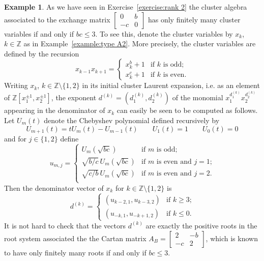 \documentclass{amsart}
\theoremstyle{definition}
\newtheorem{example}[theorem]{Example}
\theoremstyle{remark}
\numberwithin{equation}{section}
\newcommand{\ZZ}{{\mathbb{Z}}}
\begin{document}
  \begin{example}
    As we have seen in Exercise~\ref{exercise:rank 2} the cluster algebra associated to the exchange matrix $\left[\begin{array}{cc}0 & b\\ -c & 0\end{array}\right]$ has only finitely many cluster variables if and only if $bc\le3$.  To see this, denote the cluster variables by $x_k$, $k\in\ZZ$ as in Example~\ref{example:type A2}.  More precisely, the cluster variables are defined by the recursion
    \[x_{k-1}x_{k+1}=\begin{cases}x_k^b+1 & \text{if $k$ is odd;}\\ x_k^c+1 & \text{if $k$ is even.}\end{cases}\]
    Writing $x_k$, $k\in\ZZ\setminus\{1,2\}$ in its initial cluster Laurent expansion, i.e. as an element of $\ZZ[x_1^{\pm1},x_2^{\pm1}]$, the exponent $d^{(k)}=(d_1^{(k)},d_2^{(k)})$ of the monomial $x_1^{d^{(k)}_1}x_2^{d^{(k)}_2}$ appearing in the denominator of $x_k$ can easily be seen to be computed as follows.  Let $U_m(t)$ denote the Chebyshev polynomial defined recursively by 
    \[U_{m+1}(t)=tU_m(t)-U_{m-1}(t)\qquad U_1(t)=1\qquad U_0(t)=0\]
    and for $j\in\{1,2\}$ define 
    \[u_{m,j}=\begin{cases}U_m(\sqrt{bc}) & \text{if $m$ is odd;}\\\sqrt{b/c}\,U_m(\sqrt{bc}) & \text{if $m$ is even and $j=1$;}\\\sqrt{c/b}\,U_m(\sqrt{bc}) & \text{if $m$ is even and $j=2$.}\\\end{cases}\]
    Then the denominator vector of $x_k$ for $k\in\ZZ\setminus\{1,2\}$ is
    \begin{equation}\label{eq:rank 2 denominators}
      d^{(k)}=\begin{cases}(u_{k-2,1},u_{k-3,2}) & \text{if $k\ge3$;}\\(u_{-k,1},u_{-k+1,2}) & \text{if $k\le0$.}\end{cases}
    \end{equation}
    It is not hard to check that the vectors $d^{(k)}$ are exactly the positive roots in the root system associated the the Cartan matrix $A_B=\left[\begin{array}{cc} 2 & -b\\ -c & 2\end{array}\right]$, which is known to have only finitely many roots if and only if $bc\le3$.
  \end{example}
\end{document}
